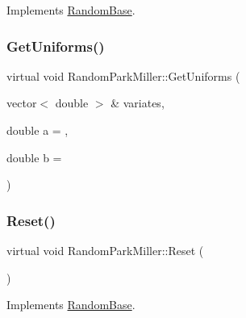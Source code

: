 Implements \hyperlink{classRandomBase_aa061fb77f53969f6fbe40c7454c69eb9}{Random\+Base}.

\hypertarget{classRandomParkMiller_a8662b99ba7a4a082d694f831cf6f43d8}{}\label{classRandomParkMiller_a8662b99ba7a4a082d694f831cf6f43d8} 
\subsubsection{\texorpdfstring{Get\+Uniforms()}{GetUniforms()}\hspace{0.1cm}{\footnotesize\ttfamily [2/2]}}
{\footnotesize\ttfamily virtual void Random\+Park\+Miller\+::\+Get\+Uniforms (\begin{DoxyParamCaption}\item[{vector$<$ double $>$ \&}]{variates,  }\item[{double}]{a = {},  }\item[{double}]{b = {} }\end{DoxyParamCaption})\hspace{0.3cm}{\ttfamily [virtual]}}

\hypertarget{classRandomParkMiller_a3149e8b0b8f2bba6b389325cd6d61cc0}{}\label{classRandomParkMiller_a3149e8b0b8f2bba6b389325cd6d61cc0} 
\subsubsection{\texorpdfstring{Reset()}{Reset()}}
{\footnotesize\ttfamily virtual void Random\+Park\+Miller\+::\+Reset (\begin{DoxyParamCaption}{ }\end{DoxyParamCaption})\hspace{0.3cm}{\ttfamily [virtual]}}



Implements \hyperlink{classRandomBase_a6e35c1467b37fc8c5e262297223685eb}{Random\+Base}.

\hypertarget{classRandomParkMiller_a2dff7d05b001445fe8e322f2bdc98ac7}{}\label{classRandomParkMiller_a2dff7d05b001445fe8e322f2bdc98ac7} 
